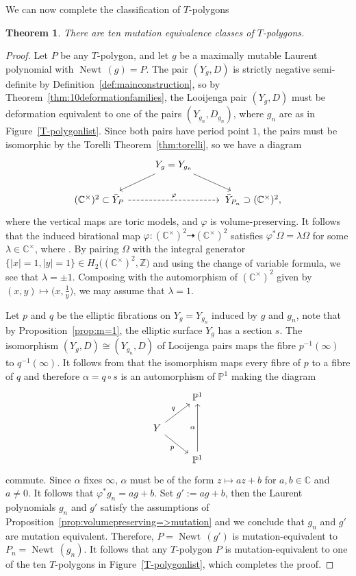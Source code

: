 \documentclass[pdftex]{sigma}
\numberwithin{equation}{section}
\newtheorem{Theorem}{Theorem}[section]
\DeclareMathOperator{\Newt}{{Newt \,}}
\newcommand{\CC}{\mathbb{C}}
\newcommand{\PP}{\mathbb{P}}
\newcommand{\ZZ}{\mathbb{Z}}
\begin{document}
We can now complete the classification of $T$-polygons
\begin{Theorem}\label{cor:10mutationclasses}
	There are ten mutation equivalence classes of $T$-polygons.
\end{Theorem}
\begin{proof}
	Let $P$ be any $T$-polygon, and let $g$ be a maximally mutable Laurent polynomial with $\Newt(g)=P$. The pair $(Y_g, D)$ is strictly negative semi-definite by Definition~\ref{def:mainconstruction}, so by Theorem~\ref{thm:10deformationfamilies}, the Looijenga pair $(Y_g, D)$ must be deformation equivalent to one of the pairs $(Y_{g_n}, D_{g_n})$, where $g_n$ are as in Figure~\ref{T-polygonlist}. Since both pairs have period point $1$, the pairs must be isomorphic by the Torelli Theorem~\ref{thm:torelli}, so we have a diagram
	\[
	\begin{tikzcd}
		&Y_g=Y_{g_n} \arrow[dr] \arrow[dl] & \\
		(\CC^\times)^2 \subset \bar{Y}_{P} \ar[rr, dashed, "\varphi"]&&\,\bar{Y}_{P_n} \supset (\CC^\times)^2,
	\end{tikzcd}
	\]
	where the vertical maps are toric models, and $\varphi$ is volume-preserving.
	 It follows that the induced birational map $\varphi \colon (\CC^\times)^2 \dashrightarrow (\CC^\times)^2$ satisfies $\varphi^*\Omega=\lambda \Omega$ for some $\lambda \in \CC^\times$, where . By pairing $\Omega$ with the integral generator $\{|x|=1, |y|=1\} \in H_2\bigl((\CC^\times)^2, \ZZ\bigr)$ and using the change of variable formula, we see that $\lambda=\pm 1$. Composing with the automorphism of $(\CC^\times)^2$ given by~$(x,y) \mapsto \bigl(x, \frac{1}{y}\bigr)$, we may assume that $\lambda=1$.

	Let $p$ and $q$ be the elliptic fibrations on $Y_g=Y_{g_n}$ induced by $g$ and $g_n$, note that by Proposition~\ref{prop:m=1}, the elliptic surface $Y_g$ has a section $s$. The isomorphism $(Y_g, D) \cong (Y_{g_n}, D)$ of Looijenga pairs maps the fibre $p^{-1}(\infty)$ to $q^{-1}(\infty)$. It follows from \cite[Lemma~1.5]{ClemensKollarMori} that the isomorphism maps every fibre of $p$ to a fibre of $q$ and therefore $\alpha=q \circ s$ is an automorphism of $\PP^1$ making the diagram
	\[
	\begin{tikzcd}
		&\PP^1 \\
		Y \arrow[dr, swap, "p"] \arrow[ur, "q"] &\\
		& \PP^1 \arrow[uu, "\alpha"]
	\end{tikzcd}
	\]
	commute.
	Since $\alpha$ fixes $\infty$, $\alpha$ must be of the form $z \mapsto az+b$ for $a,b \in \CC$ and $a \neq 0$.
	It follows that $\varphi^*{g_n}=ag+b$. Set $g':=ag+b$, then the Laurent polynomials $g_n$ and $g'$ satisfy the assumptions of Proposition~\ref{prop:volumepreserving=>mutation} and we conclude that $g_n$ and $g'$ are mutation equivalent. Therefore, $P=\Newt(g')$ is mutation-equivalent to $P_n=\Newt(g_n)$.
	It follows that any $T$-polygon $P$ is mutation-equivalent to one of the ten $T$-polygons in Figure~\ref{T-polygonlist}, which completes the proof.
\end{proof}
\end{document}
